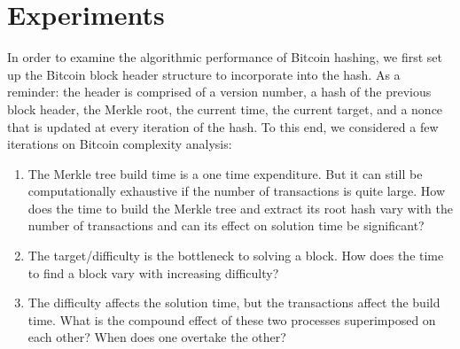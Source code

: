 \documentclass[pdftex,11pt]{article}
\begin{document}
\section{Experiments}
In order to examine the algorithmic performance of Bitcoin hashing, we first set up the Bitcoin block header structure to incorporate into the hash. As a reminder: the header is comprised of a version number, a hash of the previous block header, the Merkle root, the current time, the current target, and a nonce that is updated at every iteration of the hash. To this end, we considered a few iterations on Bitcoin complexity analysis:
\begin{enumerate}
	\item The Merkle tree build time is a one time expenditure. But it can still be computationally exhaustive if the number of transactions is quite large. How does the time to build the Merkle tree and extract its root hash vary with the number of transactions and can its effect on solution time be significant?
	\item The target/difficulty is the bottleneck to solving a block. How does the time to find a block vary with increasing difficulty?
	\item The difficulty affects the solution time, but the transactions affect the build time. What is the compound effect of these two processes superimposed on each other? When does one overtake the other?
\end{enumerate}
\end{document}
